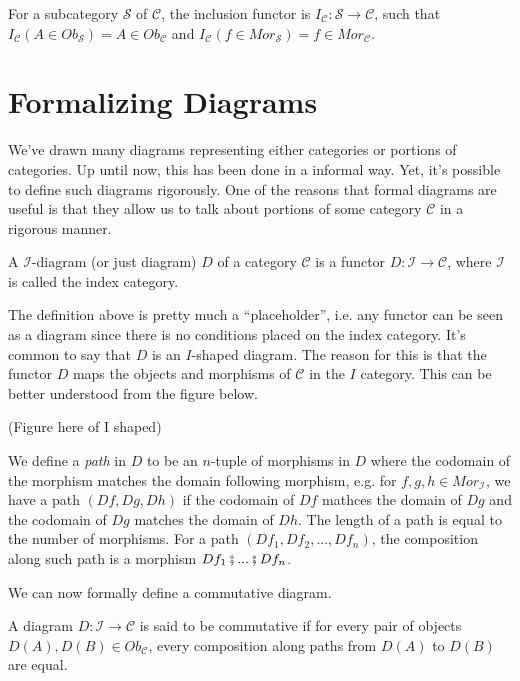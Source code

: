 \begin{example}
	For a subcategory $\mathcal S$ of $\mathcal C$, the inclusion
	functor is $I_\mathcal C : \mathcal S \to \mathcal C$, such that
	$I_\mathcal C (A \in Ob_\mathcal S) = A \in Ob_\mathcal C$ and
	$I_\mathcal C (f \in Mor_\mathcal S) = f \in Mor_\mathcal C$.
\end{example}

\section{Formalizing Diagrams}

We've drawn many diagrams representing either categories or portions of categories. Up
until now, this has been done in a informal way. Yet, it's possible to define such diagrams rigorously.
One of the reasons that formal diagrams are useful is that they allow us to talk about portions
of some category $\mathcal C$ in a rigorous manner.

\begin{definition}[Diagram]
	A $\mathcal I$-diagram (or just diagram) $D$ of a category $\mathcal C$ is a functor
	$D: \mathcal I \to \mathcal C$, where $\mathcal I$ is called the index category.
\end{definition}

The definition above is pretty much a ``placeholder'', i.e. any functor can be seen as
a diagram since there is no conditions placed on the index category. It's common to
say that $D$ is an $I$-shaped diagram. The reason for this is that the functor
$D$ maps the objects and morphisms of $\mathcal C$ in the $I$ category. This
can be better understood from the figure below.

(Figure here of I shaped)

We define a \textit{path} in $D$ to be an $n$-tuple of morphisms in $D$ where
the codomain of the morphism matches the domain following morphism, e.g.
for $f,g,h \in Mor_\mathcal I$, we have a path $(Df, Dg, Dh)$ if
the codomain of $Df$ mathces the domain of $Dg$ and the codomain of $Dg$ matches
the domain of $Dh$.
The length of a path is equal to the number of morphisms. For a path
$(Df_1, Df_2,...,Df_n)$, the composition along such path is a morphism $Df_1\fatsemi ...\fatsemi Df_n$.

We can now formally define a commutative diagram.

\begin{definition}
	A diagram $D:\mathcal I \to \mathcal C$ is said to be commutative if
	for every pair of objects $D(A), D(B) \in Ob_\mathcal C$,
	every composition along paths from $D(A)$ to $D(B)$ are equal.
\end{definition}

